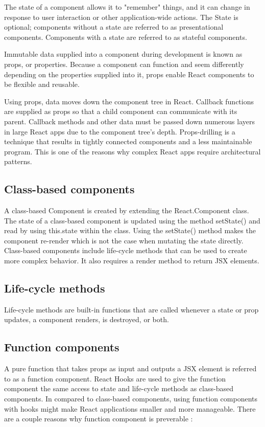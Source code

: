The state of a component allows it to "remember" things, and it can change in response to user interaction or other application-wide actions. The State is optional; components without a state are referred to as presentational components. Components with a state are referred to as stateful components.

Immutable data supplied into a component during development is known as props, or properties. Because a component can function and seem differently depending on the properties supplied into it, props enable React components to be flexible and reusable.

Using props, data moves down the component tree in React. Callback functions are supplied as props so that a child component can communicate with its parent. Callback methods and other data must be passed down numerous layers in large React apps due to the component tree's depth. Props-drilling is a technique that results in tightly connected components and a less maintainable program. This is one of the reasons why complex React apps require architectural patterns.

\subsection{Class-based components}

A class-based Component is created by extending the React.Component class. The state of a class-based component is updated using the method setState() and read by using this.state within the class. Using the setState() method makes the component re-render which is not the case when mutating the state directly. Class-based components include life-cycle methods that can be used to create more complex behavior. It also requires a render method to return JSX elements.

\subsection{Life-cycle methods}

Life-cycle methods are built-in functions that are called whenever a state or prop updates, a component renders, is destroyed, or both.

\subsection{Function components}

A pure function that takes props as input and outputs a JSX element is referred to as a function component. React Hooks are used to give the function component the same access to state and life-cycle methods as class-based components. In compared to class-based components, using function components with hooks might make React applications smaller and more manageable. There are a couple reasons why function component is preverable \autocite{phan2020react}:

